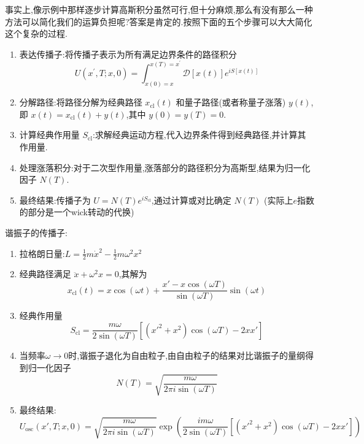 \begin{note}
	事实上,像示例中那样逐步计算高斯积分虽然可行,但十分麻烦,那么有没有那么一种方法可以简化我们的运算负担呢?答案是肯定的.按照下面的五个步骤可以大大简化这个复杂的过程.
	\begin{enumerate}
		\item 表达传播子:将传播子表示为所有满足边界条件的路径积分
		\begin{equation}
			U(x^{\prime},T;x,0)=\int_{x(0)=x}^{x(T)=x^{\prime}}\mathcal{D}[x(t)]e^{iS[x(t)]}
		\end{equation}
		\item 分解路径:将路径分解为经典路径 $x_{\text{cl}}(t)$ 和量子路径(或者称量子涨落) $y(t)$,即 $x(t) = x_{\text{cl}}(t) + y(t)$,其中 $y(0) = y(T) = 0$.
		\item 计算经典作用量 $S_{\text{cl}}$:求解经典运动方程,代入边界条件得到经典路径,并计算其作用量.\\
		\item 处理涨落积分:对于二次型作用量,涨落部分的路径积分为高斯型,结果为归一化因子 $N(T)$.
		\item 最终结果:传播子为 $U = N(T) e^{i S_{\text{cl}}}$,通过计算或对比确定 $N(T)$ (实际上$ e $指数的部分是一个wick转动的代换)
	\end{enumerate}
	\begin{solution}
		谐振子的传播子:
		\begin{enumerate}
			\item 拉格朗日量:$L = \frac{1}{2}m\dot{x}^2 - \frac{1}{2}m\omega^2 x^2$
			\item 经典路径满足 $\ddot{x} + \omega^2 x = 0$,其解为
			\begin{equation}
				x_{\text{cl}}(t) = x \cos(\omega t) + \frac{x' - x\cos(\omega T)}{\sin(\omega T)} \sin(\omega t)
			\end{equation}
			\item 经典作用量
			\begin{equation}
				S_{\text{cl}} = \frac{m\omega}{2\sin(\omega T)} \left[(x'^2 + x^2)\cos(\omega T) - 2xx'\right]
			\end{equation}
			\item 当频率$\omega\to0$时,谐振子退化为自由粒子,由自由粒子的结果对比谐振子的量纲得到归一化因子
			\begin{equation}
				N(T) = \sqrt{\frac{m\omega}{2\pi i \sin(\omega T)}}
			\end{equation}
			\item 最终结果:
			\begin{equation}
				U_{\text{osc}}(x', T; x, 0) = \sqrt{\frac{m\omega}{2\pi i \sin(\omega T)}} \exp\left( \frac{i m\omega}{2 \sin(\omega T)} \left[ (x'^2 + x^2)\cos(\omega T) - 2xx' \right] \right)
			\end{equation}
		\end{enumerate}
	\end{solution}
\end{note}
